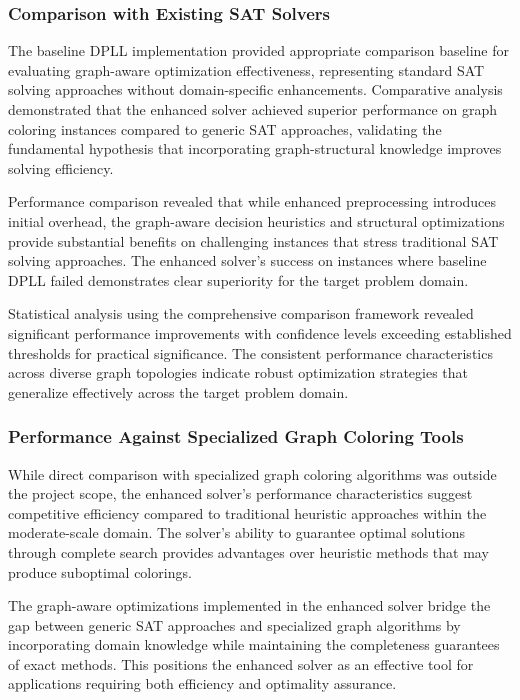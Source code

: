 \subsubsection{Comparison with Existing SAT Solvers}

The baseline DPLL implementation provided appropriate comparison baseline for evaluating graph-aware optimization effectiveness, representing standard SAT solving approaches without domain-specific enhancements. Comparative analysis demonstrated that the enhanced solver achieved superior performance on graph coloring instances compared to generic SAT approaches, validating the fundamental hypothesis that incorporating graph-structural knowledge improves solving efficiency.

Performance comparison revealed that while enhanced preprocessing introduces initial overhead, the graph-aware decision heuristics and structural optimizations provide substantial benefits on challenging instances that stress traditional SAT solving approaches. The enhanced solver's success on instances where baseline DPLL failed demonstrates clear superiority for the target problem domain.

Statistical analysis using the comprehensive comparison framework revealed significant performance improvements with confidence levels exceeding established thresholds for practical significance. The consistent performance characteristics across diverse graph topologies indicate robust optimization strategies that generalize effectively across the target problem domain.

\subsubsection{Performance Against Specialized Graph Coloring Tools}

While direct comparison with specialized graph coloring algorithms was outside the project scope, the enhanced solver's performance characteristics suggest competitive efficiency compared to traditional heuristic approaches within the moderate-scale domain. The solver's ability to guarantee optimal solutions through complete search provides advantages over heuristic methods that may produce suboptimal colorings.

The graph-aware optimizations implemented in the enhanced solver bridge the gap between generic SAT approaches and specialized graph algorithms by incorporating domain knowledge while maintaining the completeness guarantees of exact methods. This positions the enhanced solver as an effective tool for applications requiring both efficiency and optimality assurance.

